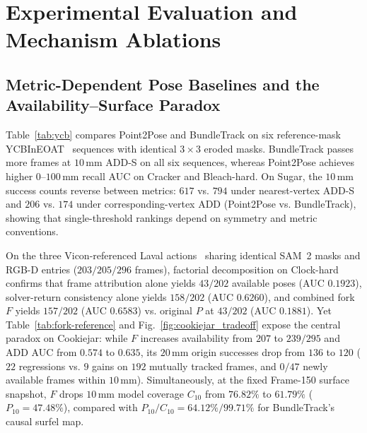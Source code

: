 \documentclass[10pt,journal]{IEEEtran}
\begin{document}
\section{Experimental Evaluation and Mechanism Ablations}
\label{sec:experiments}

\subsection{Metric-Dependent Pose Baselines and the Availability--Surface Paradox}
Table~\ref{tab:ycb} compares Point2Pose and BundleTrack on six reference-mask YCBInEOAT~\cite{tracknet} sequences with identical $3\times 3$ eroded masks. BundleTrack passes more frames at $10\,\mathrm{mm}$ ADD-S on all six sequences, whereas Point2Pose achieves higher $0$--$100\,\mathrm{mm}$ recall AUC on Cracker and Bleach-hard. On Sugar, the $10\,\mathrm{mm}$ success counts reverse between metrics: $617$ vs. $794$ under nearest-vertex ADD-S and $206$ vs. $174$ under corresponding-vertex ADD (Point2Pose vs. BundleTrack), showing that single-threshold rankings depend on symmetry and metric conventions.

\begin{table}[t]\centering\scriptsize
\caption{Selected reference-mask YCBInEOAT development results. Counts are ADD-S successes within 10 mm; AUC is failure-inclusive over 0--100 mm. P2P: Point2Pose; BT: BundleTrack. *Bleach-hard was selected after the five-sequence protocol.}\label{tab:ycb}

\end{table}

On the three Vicon-referenced Laval actions~\cite{laval} sharing identical SAM~2 masks and RGB-D entries ($203/205/296$ frames), factorial decomposition on Clock-hard confirms that frame attribution alone yields $43/202$ available poses (AUC $0.1923$), solver-return consistency alone yields $158/202$ (AUC $0.6260$), and combined fork $F$ yields $157/202$ (AUC $0.6583$) vs. original $P$ at $43/202$ (AUC $0.1881$). Yet Table~\ref{tab:fork-reference} and Fig.~\ref{fig:cookiejar_tradeoff} expose the central paradox on Cookiejar: while $F$ increases availability from $207$ to $239/295$ and ADD AUC from $0.574$ to $0.635$, its $20\,\mathrm{mm}$ origin successes drop from $136$ to $120$ ($22$ regressions vs. $9$ gains on $192$ mutually tracked frames, and $0/47$ newly available frames within $10\,\mathrm{mm}$). Simultaneously, at the fixed Frame-150 surface snapshot, $F$ drops $10\,\mathrm{mm}$ model coverage $C_{10}$ from $76.82\%$ to $61.79\%$ ($P_{10}=47.48\%$), compared with $P_{10}/C_{10}=64.12\%/99.71\%$ for BundleTrack's causal surfel map.
\end{document}

